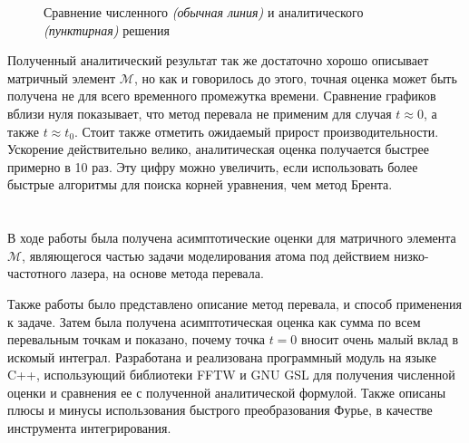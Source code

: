 \documentclass[14pt]{article}
\numberwithin{figure}{section}
\numberwithin{equation}{section}
\newcommand{\sectionbreak}{\clearpage}
\newcommand{\cM}{\mathcal{M}}
\begin{document}
\begin{figure}[h]
	\caption{Сравнение численного \textit{(обычная линия)} и аналитического \textit{(пунктирная)} решения}
	\label{ris:end2}
\end{figure}

Полученный аналитический результат так же достаточно хорошо описывает матричный элемент $\cM$, но как и говорилось до этого, точная оценка может быть получена не для всего временного промежутка времени. Сравнение графиков вблизи нуля показывает, что метод перевала не применим для случая $t\approx 0$, а также $t\approx t_0$. 
Стоит также отметить ожидаемый прирост производительности. Ускорение действительно велико, аналитическая оценка получается быстрее примерно в 10 раз. Эту цифру можно увеличить, если использовать более быстрые алгоритмы для поиска корней уравнения, чем метод Брента.

\sectionbreak
\section*{}

В ходе работы была получена асимптотические оценки для матричного элемента $\cM$, являющегося частью задачи моделирования атома под действием низко-частотного лазера, на основе метода перевала. 

Также работы было представлено описание метод перевала, и способ применения к задаче. Затем была получена асимптотическая оценка как сумма по всем перевальным точкам и показано, почему точка $t = 0$ вносит очень малый вклад в искомый интеграл. Разработана и реализована программный модуль на языке C++, использующий библиотеки FFTW и GNU GSL для получения численной оценки и сравнения ее с полученной аналитической формулой. Также описаны плюсы и минусы использования быстрого преобразования Фурье, в качестве инструмента интегрирования.
\end{document}
